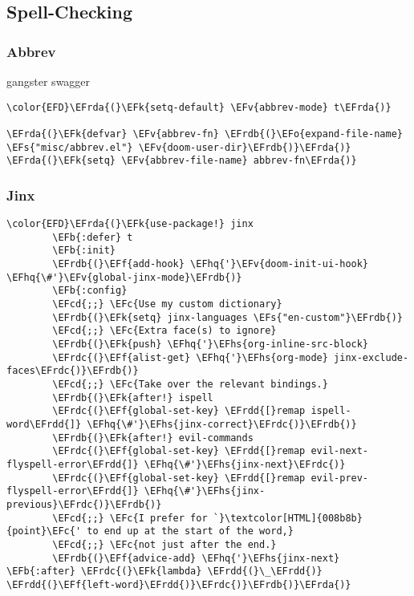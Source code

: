 \documentclass{article}
\newcommand{\EFc}[1]{\textcolor{EFc}{#1}} %
\newcommand{\EFcd}[1]{\textcolor{EFcd}{#1}} %
\newcommand{\EFs}[1]{\textcolor{EFs}{#1}} %
\newcommand{\EFk}[1]{\textcolor{EFk}{#1}} %
\newcommand{\EFb}[1]{\textcolor{EFb}{#1}} %
\newcommand{\EFf}[1]{\textcolor{EFf}{#1}} %
\newcommand{\EFv}[1]{\textcolor{EFv}{#1}} %
\newcommand{\EFo}[1]{\textcolor{EFo}{#1}} %
\newcommand{\EFhq}[1]{#1} %
\newcommand{\EFhs}[1]{\textcolor{EFhs}{#1}} %
\newcommand{\EFrda}[1]{\textcolor{EFrda}{#1}} %
\newcommand{\EFrdb}[1]{\textcolor{EFrdb}{#1}} %
\newcommand{\EFrdc}[1]{\textcolor{EFrdc}{#1}} %
\newcommand{\EFrdd}[1]{\textcolor{EFrdd}{#1}} %
\begin{document}
\subsection{Spell-Checking}
\label{sec:orgb190907}
\subsubsection{Abbrev}
\label{sec:org7a1e77f}
gangster swagger
\begin{Code}
\begin{Verbatim}
\color{EFD}\EFrda{(}\EFk{setq-default} \EFv{abbrev-mode} t\EFrda{)}

\EFrda{(}\EFk{defvar} \EFv{abbrev-fn} \EFrdb{(}\EFo{expand-file-name} \EFs{"misc/abbrev.el"} \EFv{doom-user-dir}\EFrdb{)}\EFrda{)}
\EFrda{(}\EFk{setq} \EFv{abbrev-file-name} abbrev-fn\EFrda{)}
\end{Verbatim}
\end{Code}

\subsubsection{Jinx}
\label{sec:org99111d9}
\begin{Code}
\begin{Verbatim}
\color{EFD}\EFrda{(}\EFk{use-package!} jinx
        \EFb{:defer} t
        \EFb{:init}
        \EFrdb{(}\EFf{add-hook} \EFhq{'}\EFv{doom-init-ui-hook} \EFhq{\#'}\EFv{global-jinx-mode}\EFrdb{)}
        \EFb{:config}
        \EFcd{;;} \EFc{Use my custom dictionary}
        \EFrdb{(}\EFk{setq} jinx-languages \EFs{"en-custom"}\EFrdb{)}
        \EFcd{;;} \EFc{Extra face(s) to ignore}
        \EFrdb{(}\EFk{push} \EFhq{'}\EFhs{org-inline-src-block}
        \EFrdc{(}\EFf{alist-get} \EFhq{'}\EFhs{org-mode} jinx-exclude-faces\EFrdc{)}\EFrdb{)}
        \EFcd{;;} \EFc{Take over the relevant bindings.}
        \EFrdb{(}\EFk{after!} ispell
        \EFrdc{(}\EFf{global-set-key} \EFrdd{[}remap ispell-word\EFrdd{]} \EFhq{\#'}\EFhs{jinx-correct}\EFrdc{)}\EFrdb{)}
        \EFrdb{(}\EFk{after!} evil-commands
        \EFrdc{(}\EFf{global-set-key} \EFrdd{[}remap evil-next-flyspell-error\EFrdd{]} \EFhq{\#'}\EFhs{jinx-next}\EFrdc{)}
        \EFrdc{(}\EFf{global-set-key} \EFrdd{[}remap evil-prev-flyspell-error\EFrdd{]} \EFhq{\#'}\EFhs{jinx-previous}\EFrdc{)}\EFrdb{)}
        \EFcd{;;} \EFc{I prefer for `}\textcolor[HTML]{008b8b}{point}\EFc{' to end up at the start of the word,}
        \EFcd{;;} \EFc{not just after the end.}
        \EFrdb{(}\EFf{advice-add} \EFhq{'}\EFhs{jinx-next} \EFb{:after} \EFrdc{(}\EFk{lambda} \EFrdd{(}\_\EFrdd{)} \EFrdd{(}\EFf{left-word}\EFrdd{)}\EFrdc{)}\EFrdb{)}\EFrda{)}
\end{Verbatim}
\end{Code}
\end{document}
